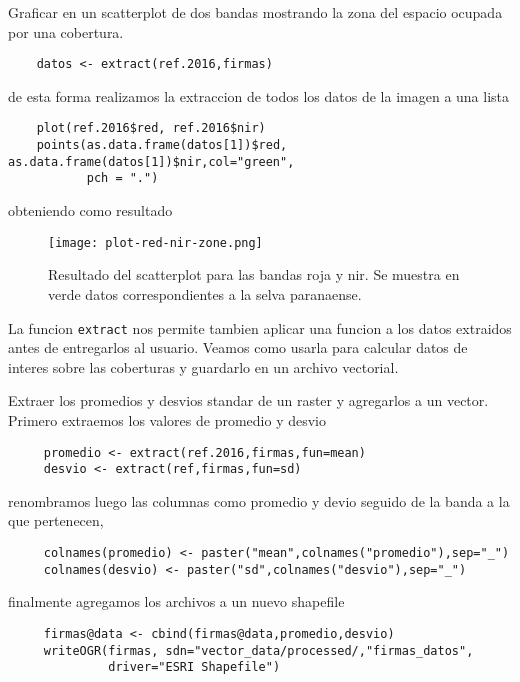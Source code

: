 \begin{exa}
    Graficar en un scatterplot de dos bandas mostrando la zona del espacio
    ocupada por una cobertura.
    \begin{lstlisting}
    datos <- extract(ref.2016,firmas)
    \end{lstlisting}
    de esta forma realizamos la extraccion de todos los datos de la imagen a una
    lista
    \begin{lstlisting}
    plot(ref.2016$red, ref.2016$nir)
    points(as.data.frame(datos[1])$red, as.data.frame(datos[1])$nir,col="green",
           pch = ".")
    \end{lstlisting}
    obteniendo como resultado
    \begin{figure}[h!]
    \begin{center}
        \texttt{[image: plot-red-nir-zone.png]}
    \end{center}
    \caption{Resultado del scatterplot para las bandas roja y nir. Se muestra en
        verde datos correspondientes a la selva paranaense.}
    \label{fig:}
    \end{figure}

\end{exa}

La funcion \texttt{extract} nos permite tambien aplicar una funcion a los datos
extraidos antes de entregarlos al usuario. Veamos como usarla para calcular
datos de interes sobre las coberturas y guardarlo en un archivo vectorial.

\begin{exa}
     Extraer los promedios y desvios standar de un raster y agregarlos a un
     vector. Primero extraemos los valores de promedio y desvio
     \begin{lstlisting}
     promedio <- extract(ref.2016,firmas,fun=mean)
     desvio <- extract(ref,firmas,fun=sd)
     \end{lstlisting}
     renombramos luego las columnas como promedio y devio seguido de la banda a
     la que pertenecen,
     \begin{lstlisting}
     colnames(promedio) <- paster("mean",colnames("promedio"),sep="_")
     colnames(desvio) <- paster("sd",colnames("desvio"),sep="_")
     \end{lstlisting}
     finalmente agregamos los archivos a un nuevo shapefile
     \begin{lstlisting}
     firmas@data <- cbind(firmas@data,promedio,desvio)
     writeOGR(firmas, sdn="vector_data/processed/,"firmas_datos",
              driver="ESRI Shapefile")
     \end{lstlisting}
\end{exa}

